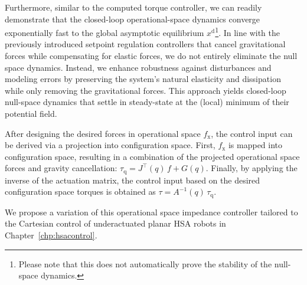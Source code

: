 Furthermore, similar to the computed torque controller, we can readily demonstrate that the closed-loop operational-space dynamics converge exponentially fast to the global asymptotic equilibrium $x^\mathrm{d}$\footnote{Please note that this does not automatically prove the stability of the null-space dynamics.}. In line with the previously introduced setpoint regulation controllers that cancel gravitational forces while compensating for elastic forces, we do not entirely eliminate the null space dynamics. Instead, we enhance robustness against disturbances and modeling errors by preserving the system’s natural elasticity and dissipation while only removing the gravitational forces. This approach yields closed-loop null-space dynamics that settle in steady-state at the (local) minimum of their potential field.

After designing the desired forces in operational space $f_\mathrm{x}$, the control input can be derived via a projection into configuration space. First, $f_\mathrm{x}$ is mapped into configuration space, resulting in a combination of the projected operational space forces and gravity cancellation: $\tau_\mathrm{q} = J^\top(q) \, f + G(q)$. Finally, by applying the inverse of the actuation matrix, the control input based on the desired configuration space torques is obtained as $\tau = A^{-1}(q) \, \tau_\mathrm{q}$.

We propose a variation of this operational space impedance controller tailored to the Cartesian control of underactuated planar \gls{HSA} robots in Chapter~\ref{chp:hsacontrol}.